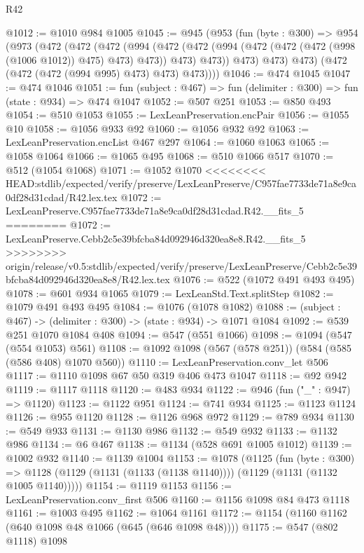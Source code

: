 \begin{lexlean}{R42}
\begin{coremodule}
{{{{{{{{{{{{{{{{{@1012 := @1010 @984 @1005
@1045 := @945
    (@953
      (fun (byte : @300) =>
      @954
        (@973
          (@472
            (@472
              (@472
                (@994
                  (@472
                    (@472 (@994 (@472 (@472 (@472 (@998 (@1006 @1012)) @475) @473) @473)) @473)
                    @473))
                @473)
              @473)
            @473)
          (@472 (@472 (@472 (@994 @995) @473) @473) @473))))
@1046 := @474 @1045
@1047 := @474 @1046
@1051 := fun (subject : @467) => fun (delimiter : @300) => fun (state : @934) => @474 @1047
@1052 := @507 @251
@1053 := @850 @493
@1054 := @510 @1053
@1055 := LexLeanPreservation.encPair
@1056 := @1055 @10
@1058 := @1056 @933 @92
@1060 := @1056 @932 @92
@1063 := LexLeanPreservation.encList @467 @297
@1064 := @1060 @1063
@1065 := @1058 @1064
@1066 := @1065 @495
@1068 := @510 @1066 @517
@1070 := @512 (@1054 @1068)
@1071 := @1052 @1070
<<<<<<<< HEAD:stdlib/expected/verify/preserve/LexLeanPreserve/C957fae7733de71a8e9ca0df28d31cdad/R42.lex.tex
@1072 := LexLeanPreserve.C957fae7733de71a8e9ca0df28d31cdad.R42.__fits_5
========
@1072 := LexLeanPreserve.Cebb2c5e39bfcba84d092946d320ea8e8.R42.__fits_5
>>>>>>>> origin/release/v0.5:stdlib/expected/verify/preserve/LexLeanPreserve/Cebb2c5e39bfcba84d092946d320ea8e8/R42.lex.tex
@1076 := @522 (@1072 @491 @493 @495)
@1078 := @601 @934 @1065
@1079 := LexLeanStd.Text.splitStep
@1082 := @1079 @491 @493 @495
@1084 := @1076 (@1078 @1082)
@1088 := (subject : @467) -> (delimiter : @300) -> (state : @934) -> @1071 @1084
@1092 := @539 @251 @1070 @1084 @408
@1094 := @547 (@551 @1066)
@1098 := @1094 (@547 (@554 @1053) @561)
@1108 := @1092 @1098 (@567 (@578 @251)) (@584 (@585 (@586 @408) @1070 @560))
@1110 := LexLeanPreservation.conv_let @506
@1117 := @1110 @1098 @67 @50 @319 @406 @473 @1047
@1118 := @92 @942
@1119 := @1117 @1118
@1120 := @483 @934
@1122 := @946 (fun ("_" : @947) => @1120)
@1123 := @1122 @951
@1124 := @741 @934
@1125 := @1123 @1124
@1126 := @955 @1120
@1128 := @1126 @968 @972
@1129 := @789 @934
@1130 := @549 @933
@1131 := @1130 @986
@1132 := @549 @932
@1133 := @1132 @986
@1134 := @6 @467
@1138 := @1134 (@528 @691 @1005 @1012)
@1139 := @1002 @932
@1140 := @1139 @1004
@1153 := @1078
    (@1125
      (fun (byte : @300) =>
      @1128 (@1129 (@1131 (@1133 (@1138 @1140)))) (@1129 (@1131 (@1132 @1005 @1140)))))
@1154 := @1119 @1153
@1156 := LexLeanPreservation.conv_first @506
@1160 := @1156 @1098 @84 @473 @1118
@1161 := @1003 @495
@1162 := @1064 @1161
@1172 := @1154 (@1160 @1162 (@640 @1098 @48 @1066 (@645 (@646 @1098 @48))))
@1175 := @547 (@802 @1118) @1098
}}}}}}}}}}}}}}}}}
\end{coremodule}
\end{lexlean}

